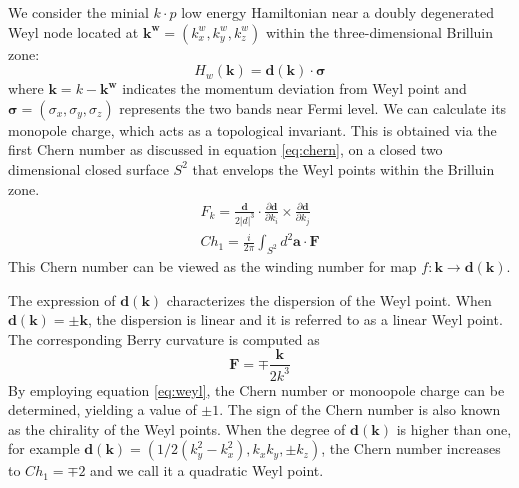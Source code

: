 We consider the minial $k\cdot p$ low energy Hamiltonian near a doubly degenerated Weyl node located at $\mathbf{k^w} = (k_x^w, k_y^w, k_z^w)$ within the three-dimensional Brilluin zone:
\begin{equation}
    H_w(\mathbf{k})=\mathbf{d}(\mathbf{k})\cdot\mathbf{\sigma}
\end{equation}
where $\mathbf{k}=k-\mathbf{k^w}$ indicates the momentum deviation from Weyl point and $\mathbf{\sigma} = (\sigma_x,\sigma_y,\sigma_z)$ represents the two bands near Fermi level. We can calculate its monopole charge, which acts as a topological invariant. This is obtained via the first Chern number as discussed in equation \ref{eq:chern}, on a closed two dimensional closed surface $S^2$ that envelops the Weyl points within the Brilluin zone. 
\begin{equation}
\label{eq:weyl}
\begin{aligned}
    F_k = \frac{\mathbf{d}}{2|d|^3}\cdot\frac{\partial \mathbf{d}}{\partial k_i}\times\frac{\partial\mathbf{d}}{\partial k_j}\\
    Ch_1 = \frac{i}{2\pi}\int_{S^2}d^2\mathbf{a}\cdot\mathbf{F}
\end{aligned}
\end{equation}
This Chern number can be viewed as the winding number for map $f: \mathbf{k}\rightarrow \mathbf{d}(\mathbf{k})$. 

The expression of $\mathbf{d}(\mathbf{k})$ characterizes the dispersion of the Weyl point. When $\mathbf{d}(\mathbf{k}) = \pm\mathbf{k}$, the dispersion is linear and it is referred to as a linear Weyl point. The corresponding Berry curvature is computed as
\begin{equation}
\mathbf{F} = \mp\frac{\mathbf{k}}{2k^3}
\end{equation}
By employing equation \ref{eq:weyl}, the Chern number or monoopole charge can be determined, yielding a value of $\pm1$. The sign of the Chern number is also known as the chirality of the Weyl points. When the degree of $\mathbf{d}(\mathbf{k})$ is higher than one, for example $\mathbf{d}(\mathbf{k}) = (1/2(k_y^2-k_x^2), k_xk_y, \pm k_z)$, the Chern number increases to $Ch_1=\mp2$ and we call it a quadratic Weyl point.

